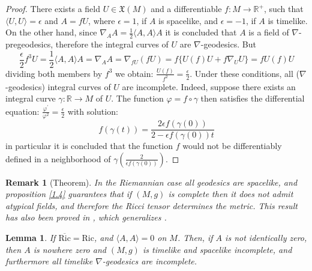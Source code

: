 \documentclass{amsart}%
\theoremstyle{plain}
\newtheorem{lemma}{Lemma}
\newtheorem{remark}{Remark}
\numberwithin{equation}{section}
\begin{document}
\begin{proof}
There exists a field $U\in\mathfrak{X}(M)$ and a differentiable
$f:M\longrightarrow\mathbb{R}^{+}$, such that $\langle U,U\rangle=\epsilon$
and $A=fU$, where $\epsilon=1$, if $A$ is spacelike, and $\epsilon=-1$, if $A$
is timelike. On the other hand, since $\nabla_{A}A=\frac{1}{2}\langle
A,A\rangle A$ it is concluded that $A$ is a field of $\nabla$-pregeodesics,
therefore the integral curves of $U$ are $\nabla$-geodesics. But
\[
\frac{\epsilon}{2}f^{3}U=\frac{1}{2}\langle A,A\rangle A=\nabla_{A}%
A=\nabla_{fU}(fU)=f\{U(f)U+f\nabla_{U}U\}=fU(f)U
\]
dividing both members by $f^{3}$ we obtain: $\frac{U(f)}{f^{2}}=\frac
{\epsilon}{2}$. Under these conditions, all ($\nabla$-geodesics) integral
curves of $U$ are incomplete. Indeed, suppose there exists an integral curve
$\gamma:\mathbb{R}\longrightarrow M$ of $U$. The function $\varphi
=f\circ\gamma$ then satisfies the differential equation: $\frac{\varphi
^{\prime}}{\varphi^{2}}=\frac{\epsilon}{2}$ with solution:%
\[
f(\gamma(t))=\frac{2\epsilon f(\gamma(0))}{2-\epsilon f(\gamma(0))t}%
\]
in particular it is concluded that the function $f$ would not be
differentiably defined in a neighborhood of $\gamma(\frac{2}{\epsilon
f(\gamma(0))})$.
\end{proof}

\begin{remark}
[Theorem]\label{Rade} In the Riemannian case all geodesics are spacelike, and
proposition \ref{1.4} guarantees that if $\left(  M,g\right)  $ is complete
then it does not admit atypical fields, and therefore the Ricci tensor
determines the metric. This result has also been proved in \cite{Kun}, which
generalizes \cite{Xing}.
\end{remark}

\begin{lemma}
\label{1.6}If $\overline{\mathrm{Ric}}=\mathrm{Ric}$, and $\langle
A,A\rangle=0$ on $M$. Then, if $A$ is not identically zero, then $A$ is
nowhere zero and $(M,g)$ is timelike and spacelike incomplete, and furthermore
all timelike $\nabla$-geodesics are incomplete.
\end{lemma}
\end{document}
